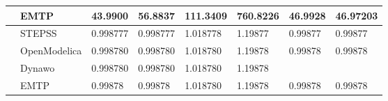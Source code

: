 \documentclass{report}
\begin{document}
\begin{table}[H]
\begin{tabular}{ll|l|l|l|l|l|l}
\multicolumn{1}{l|}{}                              & EMTP         & 43.9900                                                                           & 56.8837                                                                           & 111.3409                                                                          & 760.8226                                                                          & 46.9928                                                                           & 46.97203                                                                         \\ \hline
\multicolumn{1}{l|}{\parbox[t]{2mm}{}}    & STEPSS       & 0.998777                                                                          & 0.998777                                                                          & 1.018778                                                                          & 1.19877                                                                           & 0.99877                                                                           & 0.99877                                                                          \\
\multicolumn{1}{l|}{}                              & OpenModelica & 0.998780                                                                          & 0.998780                                                                          & 1.018780                                                                          & 1.19878                                                                           & 0.99878                                                                           & 0.99878                                                                          \\
\multicolumn{1}{l|}{}                              & Dynawo       & 0.998780                                                                          & 0.998780                                                                          & 1.018780                                                                          & 1.19878                                                                           &                                                                                   &                                                                                  \\
\multicolumn{1}{l|}{}                              & EMTP         & 0.99878                                                                           & 0.99878                                                                           & 1.018780                                                                          & 1.19878                                                                           & 0.99878                                                                           & 0.99878                                                                          \\ \hline

\end{tabular}
\end{table}
\end{document}
